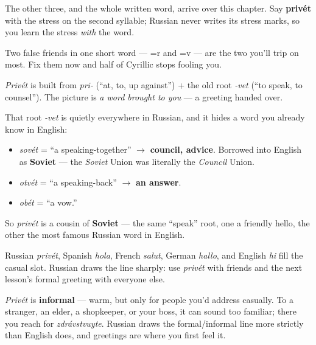 The other three, and the whole written word, arrive over this chapter. Say \textbf{privét} with the stress on the second syllable; Russian never writes its stress marks, so you learn the stress \emph{with} the word.

Two false friends in one short word — \textbf{}=r and \textbf{}=v — are the two you'll trip on most. Fix them now and half of Cyrillic stops fooling you.

\begin{cousinweb}
\emph{Privét} is built from \emph{pri-} (\textquotedblleft{}at, to, up against\textquotedblright{}) + the old root \emph{-vet} (\textquotedblleft{}to speak, to counsel\textquotedblright{}). The picture is \emph{a word brought to you} — a greeting handed over.

That root \emph{-vet} is quietly everywhere in Russian, and it hides a word you already know in English:

\begin{itemize}
\raggedright
  \item \emph{sovét} = \textquotedblleft{}a speaking-together\textquotedblright{} $\to$ \textbf{council, advice}. Borrowed into English as \textbf{Soviet} — the \emph{Soviet} Union was literally the \emph{Council} Union.
  \item \emph{otvét} = \textquotedblleft{}a speaking-back\textquotedblright{} $\to$ \textbf{an answer}.
  \item \emph{obét} = \textquotedblleft{}a vow.\textquotedblright{}
\end{itemize}

So \emph{privét} is a cousin of \textbf{Soviet} — the same \textquotedblleft{}speak\textquotedblright{} root, one a friendly hello, the other the most famous Russian word in English.
\end{cousinweb}

\begin{cousinweb}
Russian \emph{privét}, Spanish \emph{hola}, French \emph{salut}, German \emph{hallo}, and English \emph{hi} fill the casual slot. Russian draws the line sharply: use \emph{privét} with friends and the next lesson's formal greeting with everyone else.
\end{cousinweb}

\begin{culture}
\emph{Privét} is \textbf{informal} — warm, but only for people you'd address casually. To a stranger, an elder, a shopkeeper, or your boss, it can sound too familiar; there you reach for \emph{zdrávstvuyte}. Russian draws the formal/informal line more strictly than English does, and greetings are where you first feel it.
\end{culture}

